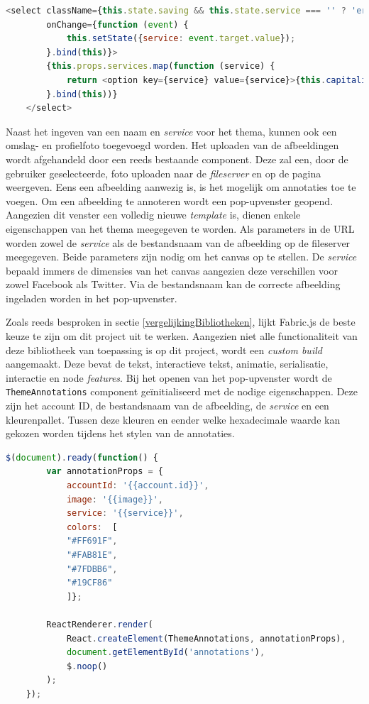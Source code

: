 \begin{lstlisting}[caption={Theme component - Dropdown},label=lst:ThemeComponentDropdown,language=javascript]
	<select className={this.state.saving && this.state.service === '' ? 'error 		fieldset-input' : 'fieldset-input'} id="service" name="service" ref="service" value={this.getService()}
		onChange={function (event) {
			this.setState({service: event.target.value});
		}.bind(this)}>
		{this.props.services.map(function (service) {
			return <option key={service} value={service}>{this.capitalize(service)}</option>
		}.bind(this))}
	</select>
\end{lstlisting}

Naast het ingeven van een naam en \textit{service} voor het thema, kunnen ook een omslag- en profielfoto toegevoegd worden. Het uploaden van de afbeeldingen wordt afgehandeld door een reeds bestaande component. Deze zal een, door de gebruiker geselecteerde, foto uploaden naar de \textit{fileserver} en op de pagina weergeven. Eens een afbeelding aanwezig is, is het mogelijk om annotaties toe te voegen. Om een afbeelding te annoteren wordt een pop-upvenster geopend. Aangezien dit venster een volledig nieuwe \textit{template} is, dienen enkele eigenschappen van het thema meegegeven te worden. Als parameters in de URL worden zowel de \textit{service} als de bestandsnaam van de afbeelding op de fileserver meegegeven. Beide parameters zijn nodig om het canvas op te stellen. De \textit{service} bepaald immers de dimensies van het canvas aangezien deze verschillen voor zowel Facebook als Twitter. Via de bestandsnaam kan de correcte afbeelding ingeladen worden in het pop-upvenster.

Zoals reeds besproken in sectie \ref{vergelijkingBibliotheken}, lijkt Fabric.js de beste keuze te zijn om dit project uit te werken. Aangezien niet alle functionaliteit van deze bibliotheek van toepassing is op dit project, wordt een \textit{custom build} aangemaakt. Deze bevat de tekst, interactieve tekst, animatie, serialisatie, interactie en node \textit{features}. Bij het openen van het pop-upvenster wordt de \texttt{ThemeAnnotations} component ge\"{i}nitialiseerd met de nodige eigenschappen. Deze zijn het account ID, de bestandsnaam van de afbeelding, de \textit{service} en een kleurenpallet. Tussen deze kleuren en eender welke hexadecimale waarde kan gekozen worden tijdens het stylen van de annotaties.

\begin{lstlisting}[caption={ThemeAnnotations component - initialisatie}, label={ThemeAnnotationsInitialisation},language=javascript]
	$(document).ready(function() {
		var annotationProps = {
			accountId: '{{account.id}}',
			image: '{{image}}',
			service: '{{service}}',
			colors:  [
			"#FF691F",
			"#FAB81E",
			"#7FDBB6",
			"#19CF86"
			]};
			
		ReactRenderer.render(
			React.createElement(ThemeAnnotations, annotationProps),
			document.getElementById('annotations'),
			$.noop()
		);
	});
\end{lstlisting}

